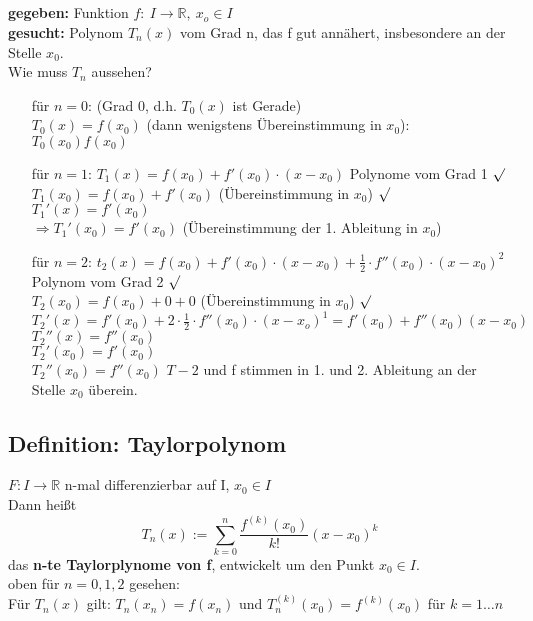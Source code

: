 \subsection*{}
\textbf{gegeben:} Funktion $f: \ I\rightarrow \mathbb{R}, \ x_o\in I$\\
\textbf{gesucht:} Polynom $T_n(x)$ vom Grad n, das f gut annähert, insbesondere an der Stelle $x_0$.\\
Wie muss $T_n$ aussehen?
\begin{enumerate}
	\item[für $n=0$:]
	(Grad 0, d.h. $T_0(x)$ ist Gerade)\\
	$T_0(x)=f(x_0)$ (dann wenigstens Übereinstimmung in $x_0$):\\
	$T_0(x_0)f(x_0)$
	
	\item[für $n=1$:]
	$T_1(x)=f(x_0)+f'(x_0)\cdot (x-x_0)$ Polynome vom Grad 1 $\surd$\\
	$T_1(x_0)=f(x_0)+f'(x_0)$ (Übereinstimmung in $x_0$) $\surd$\\
	$T_1'(x)=f'(x_0)$\\
	$\Rightarrow T_1'(x_0)=f'(x_0)$ (Übereinstimmung der 1. Ableitung in $x_0$)
	
	\item[für $n=2$:]
	$t_2(x)=f(x_0)+f'(x_0)\cdot (x-x_0)+\frac{1}{2}\cdot f''(x_0)\cdot (x-x_0)^2$ Polynom vom Grad 2 $\surd$\\
	$T_2(x_0)=f(x_0)+0+0$ (Übereinstimmung in $x_0$) $\surd$\\
	$T_2'(x)=f'(x_0)+2\cdot \frac{1}{2}\cdot f''(x_0)\cdot (x-x_o)^1=f'(x_0)+f''(x_0)(x-x_0)$\\
	$T_2''(x)=f''(x_0)$\\
	$T_2'(x_0)=f'(x_0)$\\
	$T_2''(x_0)=f''(x_0)$ $T-2$ und f stimmen in 1. und 2. Ableitung an der Stelle $x_0$ überein.
\end{enumerate}

\subsection{Definition: Taylorpolynom}
$F:I\rightarrow \mathbb{R}$ n-mal differenzierbar auf I, $x_0\in I$\\
Dann heißt \[T_n(x):=\sum_{k=0}^n \frac{f^{(k)}(x_0)}{k!}(x-x_0)^k\] das \textbf{n-te Taylorplynome von f}, entwickelt um den Punkt $x_0\in I$.\\
oben für $n=0,1,2$ gesehen:\\
Für $T_n(x)$ gilt: $T_n(x_n)=f(x_n)$ und $T_n^{(k)}(x_0)=f^{(k)}(x_0)$ für $k=1\dots n$

